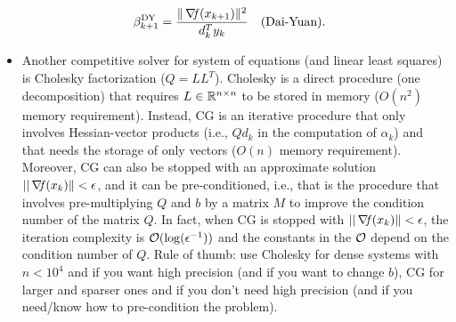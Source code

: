 \documentclass[10pt,a4paper]{article}
\begin{document}
\begin{remark}
\begin{itemize}
\begin{align*}
			\beta_{k+1}^{\text{DY}} &= \frac{\|\operatorname*{\mathit{\nabla \!f}}(x_{k+1})\|^2}{d_k^T y_k} &&\text{(Dai-Yuan)}.
		\end{align*}
		\item Another competitive solver for system of equations (and linear least squares) is Cholesky factorization ($Q=LL^T$). Cholesky is a direct procedure (one decomposition) that requires $L\in \mathbb{R}^{n\times n}$ to be stored in memory ($O(n^2)$ memory requirement). Instead, CG is an iterative procedure that only involves Hessian-vector products (i.e., $Qd_k$ in the computation of $\alpha_k$) and that needs the storage of only vectors ($O(n)$ memory requirement). Moreover, CG can also be stopped with an approximate solution $||\operatorname*{\mathit{\nabla \!f}}(x_k)\|<\epsilon$, and it can be pre-conditioned, i.e., that is the procedure that involves pre-multiplying $Q$ and $b$ by a matrix $M$ to improve the condition number of the matrix $Q$. In fact, when CG is stopped with $||\operatorname*{\mathit{\nabla \!f}}(x_k)\|<\epsilon$, the iteration complexity is $\mathcal{O}(\log(\epsilon^{-1}))$ and the constants in the $\mathcal{O}$ depend on the condition number of $Q$. Rule of thumb: use Cholesky for dense systems with $n<10^4$ and if you want high precision (and if you want to change $b$), CG for larger and sparser ones and if you don't need high precision (and if you need/know how to pre-condition the problem).
	\end{itemize}
\end{remark}


\end{document}
